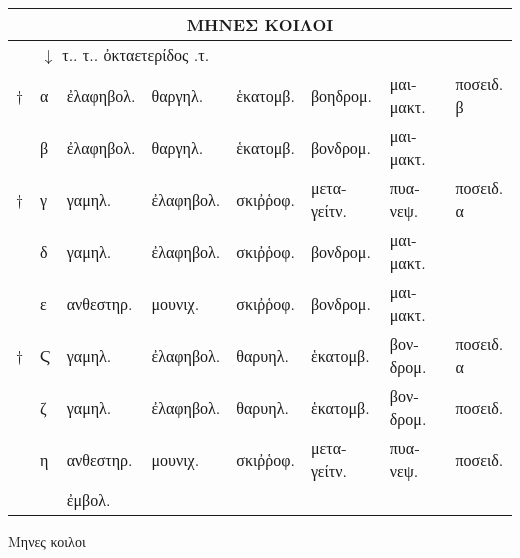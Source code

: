 \begin{tabular}{ll llllll}
\toprule
\multicolumn{8}{c}{\large{\textgreek{ΜΗΝΕΣ ΚΟΙΛΟΙ}}}
\\
\toprule
~ & \multicolumn{5}{l}{$\downarrow$ \textgreek{τ.. τ.. ὀκταετερίδος .τ.}}
\\
\midrule
\scriptsize{†} &
\textgreek{α} &
\textgreek{ἐλαφηβολ.} &
\textgreek{θαργηλ.} &
\textgreek{ἑκατομβ.} &
\textgreek{βοηδρομ.} &
\textgreek{μαιμακτ.} &
\textgreek{ποσειδ. β} 
\\
 &
\textgreek{β} &
\textgreek{ἐλαφηβολ.} &
\textgreek{θαργηλ.} &
\textgreek{ἑκατομβ.} &
\textgreek{βονδρομ.} &
\textgreek{μαιμακτ.} &

\\
\scriptsize{†} &
\textgreek{γ} &
\textgreek{γαμηλ.} &
\textgreek{ἐλαφηβολ.} &
\textgreek{σκιῤῥοφ.} &
\textgreek{μεταγείτν.} &
\textgreek{πυανεψ.} &
\textgreek{ποσειδ. α} 
\\
 &
\textgreek{δ} &
\textgreek{γαμηλ.} &
\textgreek{ἐλαφηβολ.} &
\textgreek{σκιῤῥοφ.} &
\textgreek{βονδρομ.} &
\textgreek{μαιμακτ.} &

\\
 &
\textgreek{ε} &
\textgreek{ανθεστηρ.} &
\textgreek{μουνιχ.} &
\textgreek{σκιῤῥοφ.} &
\textgreek{βονδρομ.} &
\textgreek{μαιμακτ.} &

\\
\scriptsize{†} &
\textgreek{Ϛ} &
\textgreek{γαμηλ.} &
\textgreek{ἐλαφηβολ.} &
\textgreek{θαρυηλ.} &
\textgreek{ἑκατομβ.} &
\textgreek{βονδρομ.} &
\textgreek{ποσειδ. α}
\\
 &
\textgreek{ζ} &
\textgreek{γαμηλ.} &
\textgreek{ἐλαφηβολ.} &
\textgreek{θαρυηλ.} &
\textgreek{ἑκατομβ.} &
\textgreek{βονδρομ.} &
\textgreek{ποσειδ.}

\\
 &
\textgreek{η} &
\textgreek{ανθεστηρ.} &
\textgreek{μουνιχ.} &
\textgreek{σκιῤῥοφ.} &
\textgreek{μεταγείτν.} &
\textgreek{πυανεψ.} &
\textgreek{ποσειδ.}

\\
\bottomrule
\addlinespace
~ & ~ & \multicolumn{3}{l}{\footnotesize \super{†} \textgreek{ἐμβολ.}}\\
\end{tabular}
%
\caption{\textgreek{Μηνες κοιλοι}}
\label{table:p067a}
